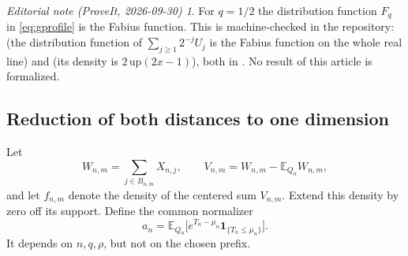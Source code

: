 \documentclass[11pt,a4paper]{article}
\numberwithin{equation}{section}
\theoremstyle{definition}
\theoremstyle{remark}
\newtheorem*{ednote}{Editorial note (ProveIt, 2026-09-30)}
\newcommand{\E}{\mathbb E}
\newcommand{\ind}{\mathbf 1}
\begin{document}
\begin{ednote}
For $q=1/2$ the distribution function $F_q$ in \eqref{eq:gprofile} is the
Fabius function. This is machine-checked in the repository:
(the distribution function of $\sum_{j\ge1}2^{-j}U_j$ is the Fabius function
on the whole real line) and
(its density is $2\,\mathrm{up}(2x-1)$), both in
.
No result of this article is formalized.
\end{ednote}

\subsection{Reduction of both distances to one dimension}
Let
\[
W_{n,m}=\sum_{j\in B_{n,m}}X_{n,j},\qquad
V_{n,m}=W_{n,m}-\E_{Q_n}W_{n,m},
\]
and let $f_{n,m}$ denote the density of the centered sum $V_{n,m}$.
Extend this density by zero off its support. Define the common
normalizer
\begin{equation}\label{eq:an}
a_n=\E_{Q_n}\bigl[e^{T_n-\mu_n}\ind_{\{T_n\le\mu_n\}}\bigr].
\end{equation}
It depends on $n,q,\rho$, but not on the chosen prefix.
\end{document}
